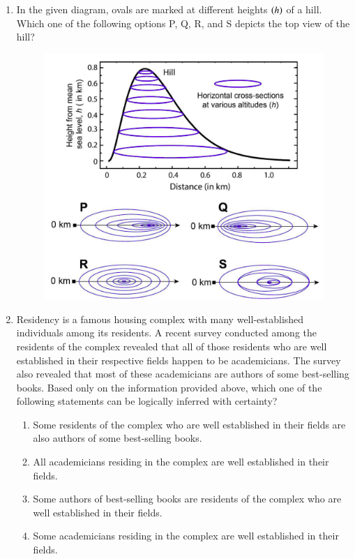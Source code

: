 \documentclass[journal,12pt,onecolumn]{IEEEtran}
\theoremstyle{remark}
\begin{document}
\begin{enumerate}[start=1, label=Q.\arabic*]
\hfill{}

\item In the given diagram, ovals are marked at different heights $\left(h\right)$ of a hill. Which one of the following options P, Q, R, and S depicts the top view of the hill?

\begin{figure}[H]
\centering
\includegraphics[width=0.7\columnwidth]{Figures/qu5.png}
\caption{}
\end{figure}

\begin{enumerate}
\end{enumerate}

\hfill{}
\item Residency is a famous housing complex with many well\mbox{-}established individuals among its residents. A recent survey conducted among the residents of the complex revealed that all of those residents who are well established in their respective fields happen to be academicians. The survey also revealed that most of these academicians are authors of some best\mbox{-}selling books. Based only on the information provided above, which one of the following statements can be logically inferred with certainty?
\begin{enumerate}
\item Some residents of the complex who are well established in their fields are also authors of some best\mbox{-}selling books.
\item All academicians residing in the complex are well established in their fields.
\item Some authors of best\mbox{-}selling books are residents of the complex who are well established in their fields.
\item Some academicians residing in the complex are well established in their fields.
\end{enumerate}


\end{enumerate}
\end{document}
